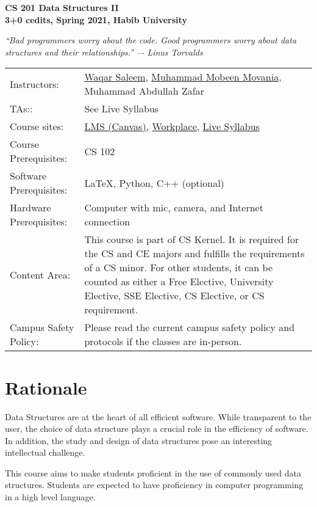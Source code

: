 \documentclass[a4paper]{article}
\begin{document}
\begin{center}
  {\bfseries {\huge CS 201 Data Structures II}\\\bigskip
    {\large 3+0 cedits, Spring 2021, Habib University}}\\\medskip

\textit{``Bad programmers worry about the code. Good programmers worry about data structures and
their relationships.''  –- Linus Torvalds}
\end{center}
\medskip

\noindent
\begin{tabularx}{1.0\linewidth}{lX}
  Instructors:
  & \href{https://habib.edu.pk/SSE/dr-waqar-saleem/}{Waqar Saleem}, \href{https://habib.edu.pk/SSE/muhammad-mobeen-movania/}{Muhammad Mobeen Movania}, Muhammad Abdullah Zafar\\
  TAs:: & See Live Syllabus \\
  Course sites: & \href{https://hulms.instructure.com/courses/1260}{LMS (Canvas)}, \href{https://habibedu.workplace.com/groups/145941763811786}{Workplace}, \href{https://bit.ly/3bSQH1k}{Live Syllabus}\\
  Course Prerequisites: &  CS 102\\
  Software Prerequisites: &  \LaTeX, Python, C++ (optional)\\
  Hardware Prerequisites: & Computer with mic, camera, and Internet connection\\
  Content Area: & This course is part of CS Kernel. It is required for the CS and CE majors and fulfills the requirements of a CS minor. For other students, it can be counted as either a Free Elective, University Elective, SSE Elective, CS Elective, or CS requirement.\\
  Campus Safety Policy: & Please read the current campus safety policy and protocols if the classes are in-person.  
\end{tabularx}
\medskip

\section{Rationale}

Data Structures are at the heart of all efficient software. While transparent to the user, the choice of data structure plays a crucial role in the efficiency of software. In addition, the study and design of data structures pose an interesting intellectual challenge. 

This course aims to make students proficient in the use of commonly used data structures. Students are expected to have proficiency in computer programming in a high level language. 
\end{document}
